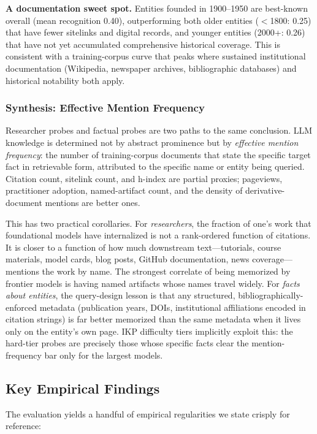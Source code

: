 \documentclass[11pt]{article}
\begin{document}
\textbf{A documentation sweet spot.} Entities founded in 1900--1950 are best-known overall (mean recognition 0.40), outperforming both older entities ($<$1800: 0.25) that have fewer sitelinks and digital records, and younger entities (2000+: 0.26) that have not yet accumulated comprehensive historical coverage. This is consistent with a training-corpus curve that peaks where sustained institutional documentation (Wikipedia, newspaper archives, bibliographic databases) and historical notability both apply.

\subsubsection{Synthesis: Effective Mention Frequency}

Researcher probes and factual probes are two paths to the same conclusion. LLM knowledge is determined not by abstract prominence but by \emph{effective mention frequency}: the number of training-corpus documents that state the specific target fact in retrievable form, attributed to the specific name or entity being queried. Citation count, sitelink count, and h-index are partial proxies; pageviews, practitioner adoption, named-artifact count, and the density of derivative-document mentions are better ones.

This has two practical corollaries. For \emph{researchers}, the fraction of one's work that foundational models have internalized is not a rank-ordered function of citations. It is closer to a function of how much downstream text---tutorials, course materials, model cards, blog posts, GitHub documentation, news coverage---mentions the work by name. The strongest correlate of being memorized by frontier models is having named artifacts whose names travel widely. For \emph{facts about entities}, the query-design lesson is that any structured, bibliographically-enforced metadata (publication years, DOIs, institutional affiliations encoded in citation strings) is far better memorized than the same metadata when it lives only on the entity's own page. IKP difficulty tiers implicitly exploit this: the hard-tier probes are precisely those whose specific facts clear the mention-frequency bar only for the largest models.

\subsection{Key Empirical Findings}
\label{sec:stylized}

The evaluation yields a handful of empirical regularities we state crisply for reference:
\end{document}
